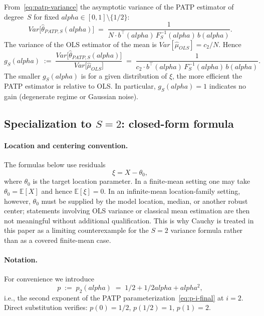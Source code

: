 \documentclass[11pt]{article}
\def\alpha{alpha}%
\def\vec#1{#1}%
\def\mathbf#1{#1}%
\def\mathrm#1{#1}%
\def\tfrac#1#2{#1/#2}%
\theoremstyle{definition}
\newcommand{\E}{\mathbb{E}}
\newcommand{\Var}{\mathrm{Var}}
\newcommand{\PATP}{\mathrm{PATP}}
\begin{document}
From~\eqref{eq:patp-variance} the asymptotic variance of the PATP estimator
of degree~$S$ for fixed $\alpha \in [0,1] \setminus \{1/2\}$:
\begin{equation}\label{eq:var-patp-2}
  \Var\bigl[\hat\theta_{\PATP,S}(\alpha)\bigr]
  \;=\; \frac{1}{N \cdot
                \vec b^{\top}(\alpha)\,
                \mathbf{F}_S^{-1}(\alpha)\,
                \vec b(\alpha)}.
\end{equation}
The variance of the OLS estimator of the mean is $\Var[\hat\mu_{\mathrm{OLS}}] = c_2/N$.
Hence
\begin{equation}\label{eq:gS-alpha-def}
  g_S(\alpha)
  \;:=\; \frac{\Var\bigl[\hat\theta_{\PATP,S}(\alpha)\bigr]}
              {\Var\bigl[\hat\mu_{\mathrm{OLS}}\bigr]}
  \;=\; \frac{1}{c_2 \cdot \vec b^{\top}(\alpha)\,
                \mathbf{F}_S^{-1}(\alpha)\,\vec b(\alpha)}.
\end{equation}
The smaller $g_S(\alpha)$ is for a given distribution of $\xi$, the more
efficient the PATP estimator is relative to OLS. In particular,
$g_S(\alpha) = 1$ indicates no gain (degenerate regime or Gaussian noise).

\subsection[Specialization to S = 2: closed-form formula]{Specialization to $S = 2$: closed-form formula}\label{sec:eff:s2}

\paragraph{Location and centering convention.}
The formulas below use residuals
\[
  \xi = X-\theta_0,
\]
where $\theta_0$ is the target location parameter. In a finite-mean setting
one may take $\theta_0=\E[X]$ and hence $\E[\xi]=0$. In an infinite-mean
location-family setting, however, $\theta_0$ must be supplied by the model
location, median, or another robust center; statements involving OLS variance
or classical mean estimation are then not meaningful without additional
qualification. This is why Cauchy is treated in this paper as a limiting
counterexample for the $S=2$ variance formula rather than as a covered
finite-mean case.

\paragraph{Notation.}
For convenience we introduce
\begin{equation}\label{eq:p-notation}
  p \;:=\; p_2(\alpha)
  \;=\; \tfrac{1}{2} + \tfrac{1}{2}\alpha + \alpha^2,
\end{equation}
i.e., the second exponent of the PATP parameterization~\eqref{eq:p-i-final}
at $i = 2$. Direct substitution verifies: $p(0) = 1/2$, $p(1/2) = 1$,
$p(1) = 2$.
\end{document}
